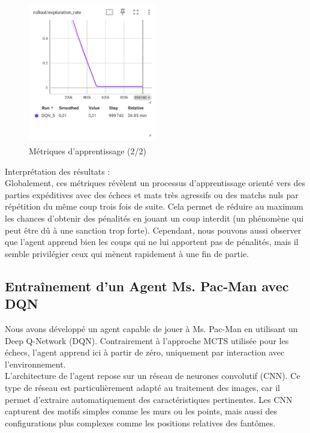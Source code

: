 \documentclass{article}
\begin{document}
    \clearpage
    
    \begin{figure}[ht]
        \centering
        \includegraphics[width=0.5\textwidth]{12.png}
        \caption{Métriques d'apprentissage (2/2)}
    \end{figure}

    Interprétation des résultats :\\

    Globalement, ces métriques révèlent un processus d'apprentissage orienté vers des parties expéditives avec des échecs et mats très agressifs ou des matchs nuls par répétition du même coup trois fois de suite. Cela permet de réduire au maximum les chances d'obtenir des pénalités en jouant un coup interdit (un phénomène qui peut être dû à une sanction trop forte). Cependant, nous pouvons aussi observer que l'agent apprend bien les coups qui ne lui apportent pas de pénalités, mais il semble privilégier ceux qui mènent rapidement à une fin de partie.

\clearpage

\subsection{Entraînement d'un Agent Ms. Pac-Man avec DQN}

\quad Nous avons développé un agent capable de jouer à Ms. Pac-Man en utilisant un Deep Q-Network (DQN). Contrairement à l’approche MCTS utilisée pour les échecs, l’agent apprend ici à partir de zéro, uniquement par interaction avec l’environnement.\\

L’architecture de l’agent repose sur un réseau de neurones convolutif (CNN). Ce type de réseau est particulièrement adapté au traitement des images, car il permet d’extraire automatiquement des caractéristiques pertinentes. Les CNN capturent des motifs simples comme les murs ou les points, mais aussi des configurations plus complexes comme les positions relatives des fantômes.\\
\end{document}
